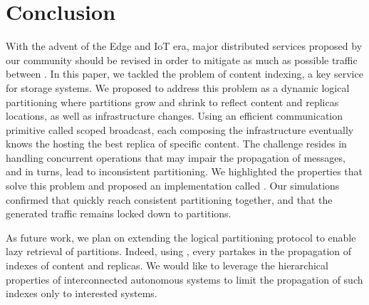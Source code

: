 \section{Conclusion}
\label{sec:conclusion}

With the advent of the Edge and IoT era, major distributed services
proposed by our community should be revised in order to mitigate as
much as possible traffic between \processes.  In this paper, we
tackled the problem of content indexing, a key service for storage
systems.
%
We proposed to address this problem as a dynamic logical partitioning
where partitions grow and shrink to reflect content and replicas
locations, as well as infrastructure changes. Using an efficient
communication primitive called scoped broadcast, each \process
composing the infrastructure eventually knows the \process hosting the
best replica of specific content.  The challenge resides in handling
concurrent operations that may impair the propagation of messages, and
in turns, lead to inconsistent partitioning.
%
We highlighted the properties that solve this problem and proposed an
implementation called \NAME.  Our simulations confirmed that
\processes quickly reach consistent partitioning together, and that
the generated traffic remains locked down to partitions.

As future work, we plan on extending the logical partitioning protocol
to enable lazy retrieval of partitions. Indeed, using \NAME, every
\process partakes in the propagation of indexes of content and
replicas. We would like to leverage the hierarchical properties of
interconnected autonomous systems to limit the propagation of such
indexes only to interested systems.
%
%
%

